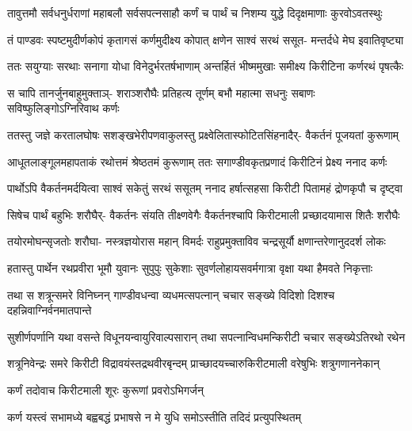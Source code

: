 \fourlineindentedshloka
{तावुत्तमौ सर्वधनुर्धराणां}
{महाबलौ सर्वसपत्नसाहौ}
{कर्णं च पार्थं च निशम्य युद्धे}
{दिदृक्षमाणाः कुरवोऽवतस्थुः}


\fourlineindentedshloka
{तं पाण्डवः स्पष्टमुदीर्णकोपं}
{कृतागसं कर्णमुदीक्ष्य कोपात्}
{क्षणेन साश्वं सरथं ससूत-}
{मन्तर्दधे मेघ इवातिवृष्ट्या}


\fourlineindentedshloka
{ततः सयुग्याः सरथाः सनागा}
{योधा विनेदुर्भरतर्षभाणाम्}
{अन्तर्हितं भीष्ममुखाः समीक्ष्य}
{किरीटिना कर्णरथं पृषत्कैः}


\fourlineindentedshloka
{स चापि तानर्जुनबाहुमुक्ताञ्-}
{शराञ्शरौघैः प्रतिहत्य तूर्णम्}
{बभौ महात्मा सधनुः सबाणः}
{सविष्फुलिङ्गोऽग्निरिवाथ कर्णः}


\fourlineindentedshloka
{ततस्तु जज्ञे करतालघोषः}
{सशङ्खभेरीपणवाकुलस्तु}
{प्रक्ष्वेलितास्फोटितसिंहनादैर्-}
{वैकर्तनं पूजयतां कुरूणाम्}


\fourlineindentedshloka
{आधूतलाङ्गूलमहापताकं}
{रथोत्तमं श्रेष्ठतमं कुरूणाम्}
{ततः सगाण्डीवकृतप्रणादं}
{किरीटिनं प्रेक्ष्य ननाद कर्णः}


\fourlineindentedshloka
{पार्थोऽपि वैकर्तनमर्दयित्वा}
{साश्वं सकेतुं सरथं ससूतम्}
{ननाद हर्षात्सहसा किरीटी}
{पितामहं द्रोणकृपौ च दृष्ट्वा}


\fourlineindentedshloka
{सिषेच पार्थं बहुभिः शरौघैर्-}
{वैकर्तनः संयति तीक्ष्णवेगैः}
{वैकर्तनश्चापि किरीटमाली}
{प्रच्छादयामास शितैः शरौघैः}


\fourlineindentedshloka
{तयोरमोघन्सृजतोः शरौघा-}
{नस्त्रज्ञयोरास महान् विमर्दः}
{राहुप्रमुक्ताविव चन्द्रसूर्यौ}
{क्षणान्तरेणानुददर्श लोकः}


\fourlineindentedshloka
{हतास्तु पार्थेन रथप्रवीरा}
{भूमौ युवानः सुपुपुः सुकेशाः}
{सुवर्णलोहायसवर्मगात्रा}
{वृक्षा यथा हैमवते निकृत्ताः}


\fourlineindentedshloka
{तथा स शत्रून्समरे विनिघ्नन्}
{गाण्डीवधन्वा व्यधमत्सपत्नान्}
{चचार सङ्ख्ये विदिशो दिशश्च}
{दहन्निवाग्निर्वनमातपान्ते}


\fourlineindentedshloka
{सुशीर्णपर्णानि यथा वसन्ते}
{विधूनयन्वायुरिवाल्पसारान्}
{तथा सपत्नान्विधमन्किरीटी}
{चचार सङ्ख्येऽतिरथो रथेन}


\fourlineindentedshloka
{शत्रूनिवेन्द्रः समरे किरीटी}
{विद्रावयंस्तद्रथवीरबृन्दम्}
{प्राच्छादयच्चारुकिरीटमाली}
{वरेषुभिः शत्रुगणाननेकान्}


\onelineindentedshloka
{कर्णं तदोवाच किरीटमाली}
{शूरः कुरूणां प्रवरोऽभिगर्जन्}


\twolineshloka
{कर्ण यस्त्वं सभामध्ये बह्वबद्धं प्रभाषसे}
{न मे युधि समोऽस्तीति तदिदं प्रत्युपस्थितम्}


